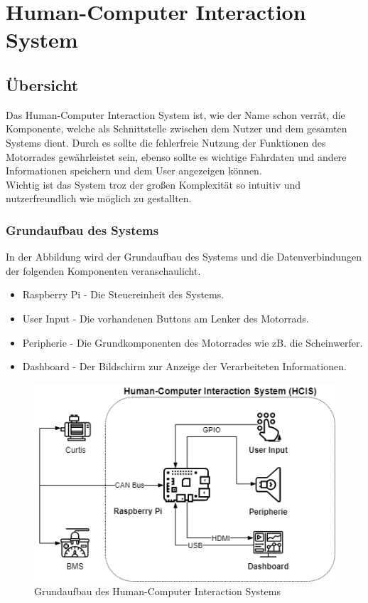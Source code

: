 
\chapter{Human-Computer Interaction System}
\section{Übersicht}
Das Human-Computer Interaction System ist, wie der Name schon verrät, die Komponente, welche als Schnittstelle zwischen dem Nutzer und dem gesamten Systems dient. Durch es sollte die fehlerfreie Nutzung der Funktionen des Motorrades gewährleistet sein, ebenso sollte es wichtige Fahrdaten und andere Informationen speichern und dem User angezeigen können.\\ Wichtig ist das System troz der großen Komplexität so intuitiv und nutzerfreundlich wie möglich zu gestallten.

\subsection{Grundaufbau des Systems}



In der Abbildung wird der Grundaufbau des Systems und die Datenverbindungen der folgenden  Komponenten veranschaulicht.
\begin{itemize}
	\item Raspberry Pi - Die Steuereinheit des Systems.
	\item User Input - Die vorhandenen Buttons am Lenker des Motorrads.
	\item Peripherie - Die Grundkomponenten des Motorrades wie zB. die Scheinwerfer. 
	\item Dashboard - Der Bildschirm zur Anzeige der Verarbeiteten Informationen.
\end{itemize}

\begin{figure}[H]
	\begin{center}
		\includegraphics[scale=0.5]{figures/hcis/HCIS_Grundfunktion.png}
		\caption{Grundaufbau des Human-Computer Interaction Systems}
	\end{center}
\end{figure}

